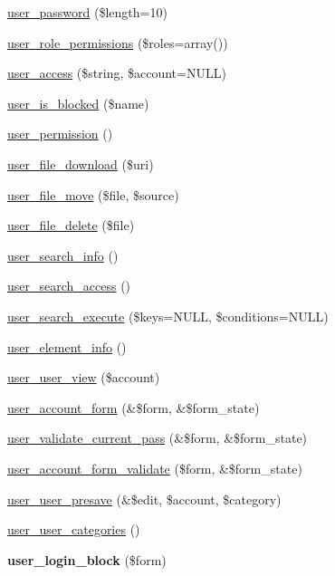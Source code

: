 \begin{DoxyCompactItemize}
\item 
\hyperlink{user_8module_a74cfb0a6ae36efdbd637792b37257931}{user\_\-password} (\$length=10)
\item 
\hyperlink{user_8module_a52111bf669fd6850eb3580e5f62d9236}{user\_\-role\_\-permissions} (\$roles=array())
\item 
\hyperlink{user_8module_a8daa9d898b1e84225b519ee0c7fb57e0}{user\_\-access} (\$string, \$account=NULL)
\item 
\hyperlink{user_8module_ac55b4d1a61adfcd30acc1b51eaa5f741}{user\_\-is\_\-blocked} (\$name)
\item 
\hyperlink{user_8module_a0eb71b2d8881ca75248f3ed384f8b253}{user\_\-permission} ()
\item 
\hyperlink{user_8module_a639df304dacc79e74a34de493586a198}{user\_\-file\_\-download} (\$uri)
\item 
\hyperlink{user_8module_a911b761d015b504f3e545b17f1403957}{user\_\-file\_\-move} (\$file, \$source)
\item 
\hyperlink{user_8module_a37b2007aaeed8fe1c1210dbc30ae2a5d}{user\_\-file\_\-delete} (\$file)
\item 
\hyperlink{user_8module_afe2b64d026bd65a294788c4abe9b4861}{user\_\-search\_\-info} ()
\item 
\hyperlink{user_8module_ac25873e619ada5dcb08431674667e7ee}{user\_\-search\_\-access} ()
\item 
\hyperlink{user_8module_a04e2120f38c081b16387b631602cc47f}{user\_\-search\_\-execute} (\$keys=NULL, \$conditions=NULL)
\item 
\hyperlink{user_8module_a39be89fedb1ce14ba1c97852daa0f7f7}{user\_\-element\_\-info} ()
\item 
\hyperlink{user_8module_a81bc32004c6a3e32a3cb0b86875b41d5}{user\_\-user\_\-view} (\$account)
\item 
\hyperlink{user_8module_ab51965add9fd8ee2915e65d39213d05c}{user\_\-account\_\-form} (\&\$form, \&\$form\_\-state)
\item 
\hyperlink{user_8module_a129d5503ac6de8cdf01d11b18e2c7298}{user\_\-validate\_\-current\_\-pass} (\&\$form, \&\$form\_\-state)
\item 
\hyperlink{user_8module_a168c461ed4da4e6a48458e68e7a85042}{user\_\-account\_\-form\_\-validate} (\$form, \&\$form\_\-state)
\item 
\hyperlink{user_8module_ab5fa3254072a5402b713090641898e65}{user\_\-user\_\-presave} (\&\$edit, \$account, \$category)
\item 
\hyperlink{user_8module_a7c04b1a53be3ea791a529a14d8f129b7}{user\_\-user\_\-categories} ()
\item 
\hypertarget{user_8module_a43678d00194ac39f759e1948405e15a2}{
{\bfseries user\_\-login\_\-block} (\$form)}
\label{user_8module_a43678d00194ac39f759e1948405e15a2}


\end{DoxyCompactItemize}
